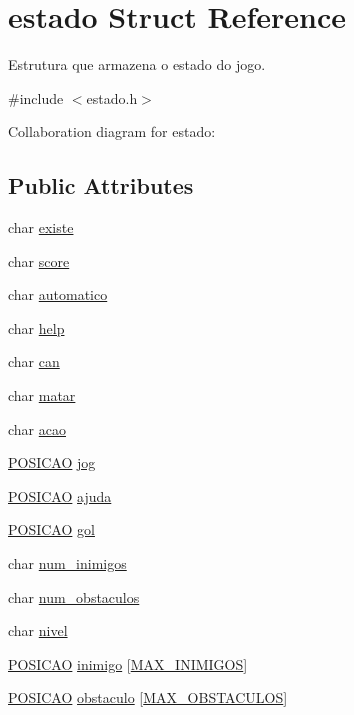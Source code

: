 \hypertarget{structestado}{\section{estado Struct Reference}
\label{structestado}
}


Estrutura que armazena o estado do jogo.  




{\ttfamily \#include $<$estado.\+h$>$}



Collaboration diagram for estado\+:
\subsection*{Public Attributes}
\begin{DoxyCompactItemize}
\item 
char \hyperlink{structestado_a36d0b93f42177acd9271d9d088814a8b}{existe}
\item 
char \hyperlink{structestado_a312d7aee47aeea05c30f01ff16fa8679}{score}
\item 
char \hyperlink{structestado_a4d74973997bfe99d6d99b1f5ffeab68e}{automatico}
\item 
char \hyperlink{structestado_a5ffbd63e69caa4229f7541d67b89138b}{help}
\item 
char \hyperlink{structestado_ab1ce35a6c6d241c38b19f8f3d56484e4}{can}
\item 
char \hyperlink{structestado_a7254bdd4f0f4001a6143eb5b1220f62c}{matar}
\item 
char \hyperlink{structestado_ae8ee3c5f52f5342c47dcaad66e31bc58}{acao}
\item 
\hyperlink{estado_8h_a55b3f4b56938eeb8fa5e8f9c07baf1b0}{P\+O\+S\+I\+C\+A\+O} \hyperlink{structestado_abf55d0d40aafdd6829efbc8265b4f724}{jog}
\item 
\hyperlink{estado_8h_a55b3f4b56938eeb8fa5e8f9c07baf1b0}{P\+O\+S\+I\+C\+A\+O} \hyperlink{structestado_a426cd99284bc16bd15156a80ff72529c}{ajuda}
\item 
\hyperlink{estado_8h_a55b3f4b56938eeb8fa5e8f9c07baf1b0}{P\+O\+S\+I\+C\+A\+O} \hyperlink{structestado_a263fcce8335baa7ccdff318a22816891}{gol}
\item 
char \hyperlink{structestado_a6fbc4a80c4f371036f264ecfe27e5f9e}{num\+\_\+inimigos}
\item 
char \hyperlink{structestado_ac1a8a541e2301189833c6f713c416063}{num\+\_\+obstaculos}
\item 
char \hyperlink{structestado_a620f2f81ebfe4cba1d6e44b09a1762f7}{nivel}
\item 
\hyperlink{estado_8h_a55b3f4b56938eeb8fa5e8f9c07baf1b0}{P\+O\+S\+I\+C\+A\+O} \hyperlink{structestado_a8f7d47deb337ae082beab6a574ace9e3}{inimigo} \mbox{[}\hyperlink{estado_8h_aa97e6cbfdd94711688f1176cb8dd916a}{M\+A\+X\+\_\+\+I\+N\+I\+M\+I\+G\+O\+S}\mbox{]}
\item 
\hyperlink{estado_8h_a55b3f4b56938eeb8fa5e8f9c07baf1b0}{P\+O\+S\+I\+C\+A\+O} \hyperlink{structestado_a970dc20c6687acb17c3f08c06edbed4f}{obstaculo} \mbox{[}\hyperlink{estado_8h_ac574e2817856ecc9a890d2d47cb9d783}{M\+A\+X\+\_\+\+O\+B\+S\+T\+A\+C\+U\+L\+O\+S}\mbox{]}
\end{DoxyCompactItemize}


